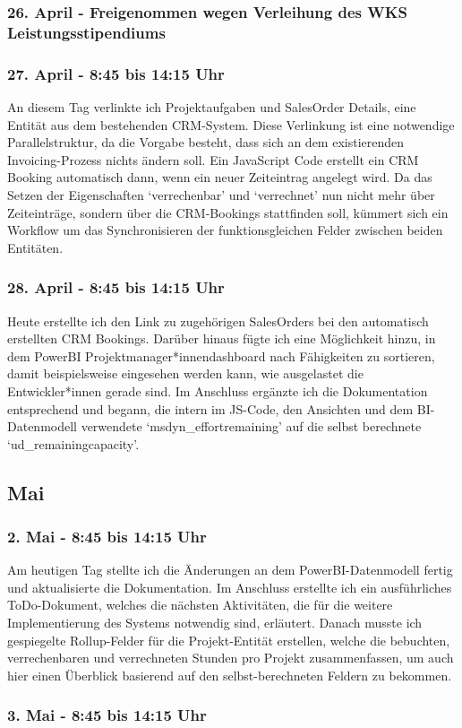 \subsubsection*{26. April - Freigenommen wegen Verleihung des WKS Leistungsstipendiums}

\subsubsection*{27. April - 8:45 bis 14:15 Uhr}
An diesem Tag verlinkte ich Projektaufgaben und SalesOrder Details, eine Entität aus dem bestehenden CRM-System. Diese Verlinkung ist eine notwendige Parallelstruktur, da die Vorgabe besteht, dass sich an dem existierenden Invoicing-Prozess nichts ändern soll. Ein JavaScript Code erstellt ein CRM Booking automatisch dann, wenn ein neuer Zeiteintrag angelegt wird. Da das Setzen der Eigenschaften \enquote*{verrechenbar} und \enquote*{verrechnet} nun nicht mehr über Zeiteinträge, sondern über die CRM-Bookings stattfinden soll, kümmert sich ein Workflow um das Synchronisieren der funktionsgleichen Felder zwischen beiden Entitäten.

\subsubsection*{28. April - 8:45 bis 14:15 Uhr}
Heute erstellte ich den Link zu zugehörigen SalesOrders bei den automatisch erstellten CRM Bookings. Darüber hinaus fügte ich eine Möglichkeit hinzu, in dem PowerBI Projektmanager*innendashboard nach Fähigkeiten zu sortieren, damit beispielsweise eingesehen werden kann, wie ausgelastet die Entwickler*innen gerade sind. Im Anschluss ergänzte ich die Dokumentation entsprechend und begann, die intern im JS-Code, den Ansichten und dem BI-Datenmodell verwendete \enquote*{msdyn\_effortremaining} auf die selbst berechnete \enquote*{ud\_remainingcapacity}.

\subsection{Mai}

\subsubsection*{2. Mai - 8:45 bis 14:15 Uhr}
Am heutigen Tag stellte ich die Änderungen an dem PowerBI-Datenmodell fertig und aktualisierte die Dokumentation. Im Anschluss erstellte ich ein ausführliches ToDo-Dokument, welches die nächsten Aktivitäten, die für die weitere Implementierung des Systems notwendig sind, erläutert. Danach musste ich gespiegelte Rollup-Felder für die Projekt-Entität erstellen, welche die bebuchten, verrechenbaren und verrechneten Stunden pro Projekt zusammenfassen, um auch hier einen Überblick basierend auf den selbst-berechneten Feldern zu bekommen.

\subsubsection*{3. Mai - 8:45 bis 14:15 Uhr}